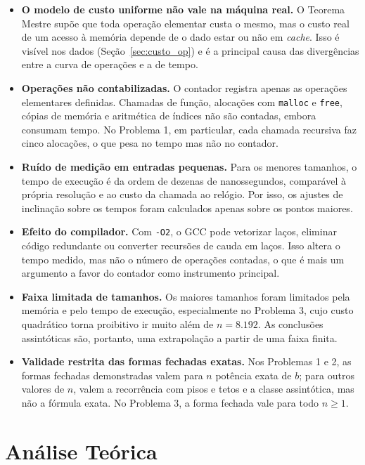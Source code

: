 \documentclass[11pt,a4paper]{article}
\begin{document}
\begin{itemize}[itemsep=2pt]
  \item \textbf{O modelo de custo uniforme não vale na máquina real.} O Teorema Mestre supõe que toda operação elementar custa o mesmo, mas o custo real de um acesso à memória depende de o dado estar ou não em \emph{cache}. Isso é visível nos dados (Seção~\ref{sec:custo_op}) e é a principal causa das divergências entre a curva de operações e a de tempo.
  \item \textbf{Operações não contabilizadas.} O contador registra apenas as operações elementares definidas. Chamadas de função, alocações com \texttt{malloc} e \texttt{free}, cópias de memória e aritmética de índices não são contadas, embora consumam tempo. No Problema 1, em particular, cada chamada recursiva faz cinco alocações, o que pesa no tempo mas não no contador.
  \item \textbf{Ruído de medição em entradas pequenas.} Para os menores tamanhos, o tempo de execução é da ordem de dezenas de nanossegundos, comparável à própria resolução e ao custo da chamada ao relógio. Por isso, os ajustes de inclinação sobre os tempos foram calculados apenas sobre os pontos maiores.
  \item \textbf{Efeito do compilador.} Com \texttt{-O2}, o GCC pode vetorizar laços, eliminar código redundante ou converter recursões de cauda em laços. Isso altera o tempo medido, mas não o número de operações contadas, o que é mais um argumento a favor do contador como instrumento principal.
  \item \textbf{Faixa limitada de tamanhos.} Os maiores tamanhos foram limitados pela memória e pelo tempo de execução, especialmente no Problema 3, cujo custo quadrático torna proibitivo ir muito além de $n=8.192$. As conclusões assintóticas são, portanto, uma extrapolação a partir de uma faixa finita.
  \item \textbf{Validade restrita das formas fechadas exatas.} Nos Problemas 1 e 2, as formas fechadas demonstradas valem para $n$ potência exata de $b$; para outros valores de $n$, valem a recorrência com pisos e tetos e a classe assintótica, mas não a fórmula exata. No Problema 3, a forma fechada vale para todo $n\ge1$.
\end{itemize}

\section{Análise Teórica}
\label{sec:teorica}
\end{document}
